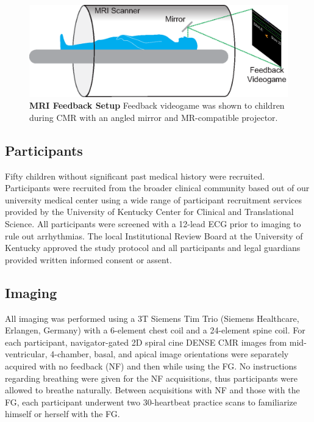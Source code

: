 \begin{figure} 
	\includegraphics{figures/gamepaper/02-feedback_videogame_in_mri}
	\caption[MRI Feedback Setup]{\textbf{MRI Feedback Setup} Feedback videogame was shown to children during CMR with an angled mirror and MR-compatible projector.}
	\label{fig:MRI_feedback}
\end{figure}

\subsection{Participants}
	Fifty children without significant past medical history were recruited. Participants were recruited from the broader clinical community based out of our university medical center using a wide range of participant recruitment services provided by the University of Kentucky Center for Clinical and Translational Science. All participants were screened with a 12-lead ECG prior to imaging to rule out arrhythmias. The local Institutional Review Board at the University of Kentucky approved the study protocol and all participants and legal guardians provided written informed consent or assent.

\subsection{Imaging}
	All imaging was performed using a 3T Siemens Tim Trio (Siemens Healthcare, Erlangen, Germany) with a 6-element chest coil and a 24-element spine coil. For each participant, navigator-gated 2D spiral cine DENSE CMR \cite{Zhong2010a,Wehner2015} images from mid-ventricular, 4-chamber, basal, and apical image orientations were separately acquired with no feedback (NF) and then while using the FG. No instructions regarding breathing were given for the NF acquisitions, thus participants were allowed to breathe naturally. Between acquisitions with NF and those with the FG, each participant underwent two 30-heartbeat practice scans to familiarize himself or herself with the FG.
	
